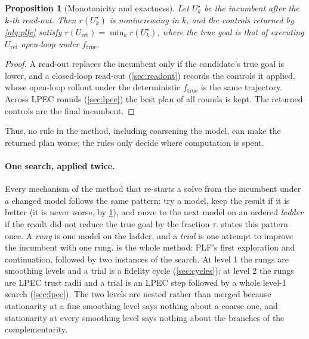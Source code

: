 \documentclass[11pt]{article}
\newtheorem{proposition}{Proposition}
\theoremstyle{remark}
\newcommand{\ftrue}{f_{\mathrm{true}}}
\newcommand{\inc}{U^\star}
\begin{document}
\begin{proposition}[Monotonicity and exactness]
\label{prop:mono}
Let $\inc_k$ be the incumbent after the $k$-th read-out. Then $r(\inc_k)$ is nonincreasing in $k$, and the controls returned by \cref{alg:plfv} satisfy $r(U_{\mathrm{ret}}) = \min_k r(\inc_k)$, where the true goal is that of executing $U_{\mathrm{ret}}$ open-loop under $\ftrue$.
\end{proposition}
\begin{proof}
A read-out replaces the incumbent only if the candidate's true goal is lower, and a closed-loop read-out (\cref{sec:readout}) records the controls it applied, whose open-loop rollout under the deterministic $\ftrue$ is the same trajectory. Across LPEC rounds (\cref{sec:lpec}) the best plan of all rounds is kept. The returned controls are the final incumbent.
\end{proof}
Thus, no rule in the method, including coarsening the model, can make the returned plan worse; the rules only decide where computation is spent.

\paragraph{One search, applied twice.} Every mechanism of the method that re-starts a solve from the incumbent under a changed model follows the same pattern: try a model, keep the result if it is better (it is never worse, by \cref{prop:mono}), and move to the next model on an ordered \emph{ladder} if the result did not reduce the true goal by the fraction $\tau$.  states this pattern once. A \emph{rung} is one model on the ladder, and a \emph{trial} is one attempt to improve the incumbent with one rung.  is the whole method: PLF's first exploration and continuation, followed by two instances of the search. At level 1 the rungs are smoothing levels and a trial is a fidelity cycle (\cref{sec:cycles}); at level 2 the rungs are LPEC trust radii and a trial is an LPEC step followed by a whole level-1 search (\cref{sec:lpec}). The two levels are nested rather than merged because stationarity at a fine smoothing level says nothing about a coarse one, and stationarity at every smoothing level says nothing about the branches of the complementarity.
\end{document}
